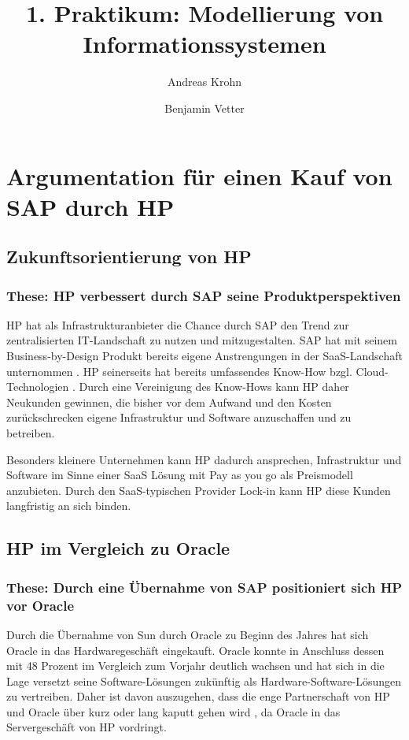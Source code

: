\documentclass[a4paper,10pt,left=1.5cm,right=1.5cm,top=1.5cm,bottom=1.5cm]{article}
\title{1. Praktikum: Modellierung von Informationssystemen}
\author{Andreas Krohn \and Benjamin Vetter}
\begin{document}
\maketitle


\section*{Argumentation für einen Kauf von SAP durch HP}

\subsection*{Zukunftsorientierung von HP}

\subsubsection*{These: HP verbessert durch SAP seine Produktperspektiven}

HP hat als Infrastrukturanbieter die Chance durch SAP den Trend zur zentralisierten IT-Landschaft zu nutzen und mitzugestalten.
SAP hat mit seinem Business-by-Design Produkt bereits eigene Anstrengungen in der SaaS-Landschaft unternommen \cite{bbd}.
HP seinerseits hat bereits umfassendes Know-How bzgl. Cloud-Technologien \cite{cioandabove}.
Durch eine Vereinigung des Know-Hows kann HP daher Neukunden gewinnen, die bisher vor dem Aufwand und den Kosten zurückschrecken eigene Infrastruktur und Software anzuschaffen und zu betreiben.

Besonders kleinere Unternehmen kann HP dadurch ansprechen, Infrastruktur und Software im Sinne einer SaaS \cite{saas} Lösung mit Pay as you go als Preismodell anzubieten.
Durch den SaaS-typischen Provider Lock-in kann HP diese Kunden langfristig an sich binden.

\subsection*{HP im Vergleich zu Oracle}

\subsubsection*{These: Durch eine Übernahme von SAP positioniert sich HP vor Oracle}

Durch die Übernahme von Sun durch Oracle zu Beginn des Jahres hat sich Oracle in das Hardwaregeschäft eingekauft.
Oracle konnte in Anschluss dessen mit 48 Prozent im Vergleich zum Vorjahr deutlich wachsen \cite{oraclegrows} und hat sich in die Lage versetzt seine Software-Lösungen zukünftig als Hardware-Software-Lösungen zu vertreiben.
Daher ist davon auszugehen, dass die enge Partnerschaft von HP und Oracle über kurz oder lang kaputt gehen wird \cite{oraclesun}, da Oracle in das Servergeschäft von HP vordringt.
\end{document}
